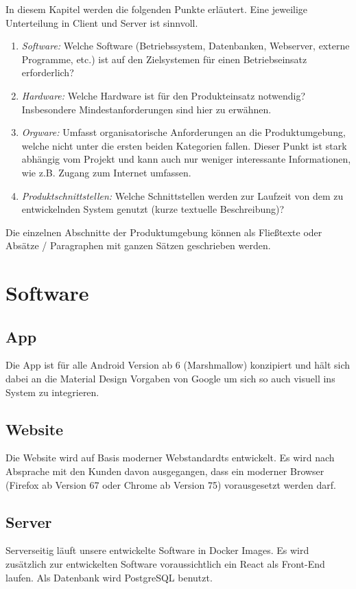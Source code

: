 \begin{tcolorbox}
In diesem Kapitel werden die folgenden Punkte erläutert. Eine jeweilige Unterteilung in Client und Server ist sinnvoll.
\begin{enumerate}
	\item \textit{Software:} Welche Software (Betriebssystem, Datenbanken, Webserver, externe Programme, etc.) ist auf den Zielsystemen für einen Betriebseinsatz erforderlich?
	\item \textit{Hardware:} Welche Hardware ist für den Produkteinsatz notwendig? Insbesondere Mindestanforderungen sind hier zu erwähnen.
	\item \textit{Orgware:} Umfasst organisatorische Anforderungen an die Produktumgebung, welche nicht unter die ersten beiden Kategorien fallen. 
	Dieser Punkt ist stark abhängig vom Projekt und kann auch nur weniger interessante Informationen, wie z.B. Zugang zum Internet umfassen.
	\item \textit{Produktschnittstellen:} Welche Schnittstellen werden zur Laufzeit von dem zu entwickelnden System genutzt (kurze textuelle Beschreibung)?
\end{enumerate}

\noindent Die einzelnen Abschnitte der Produktumgebung können als Fließtexte oder Absätze / Paragraphen mit ganzen Sätzen geschrieben werden.
\end{tcolorbox}

\section{Software}

\subsection{App}
Die App ist für alle Android Version ab 6 (Marshmallow) konzipiert und hält sich dabei an die Material Design Vorgaben von Google um sich so auch visuell ins System zu integrieren.

\subsection{Website}
Die Website wird auf Basis moderner Webstandardts entwickelt. Es wird nach Absprache mit den Kunden davon ausgegangen, dass ein moderner Browser (Firefox ab Version 67 oder Chrome ab Version 75) vorausgesetzt werden darf.

\subsection{Server} 
Serverseitig läuft unsere entwickelte Software in Docker Images. Es wird zusätzlich zur entwickelten Software voraussichtlich ein React als Front-End laufen.
Als Datenbank wird PostgreSQL benutzt.

